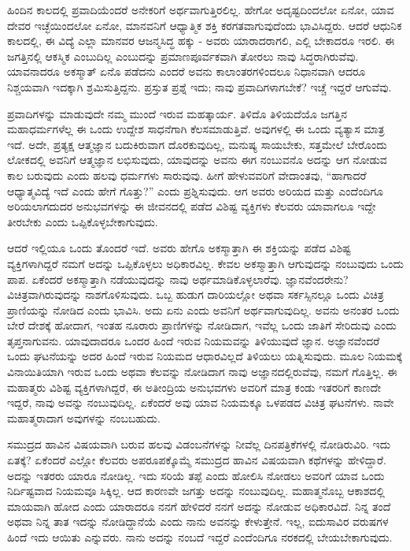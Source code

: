 ಹಿಂದಿನ ಕಾಲದಲ್ಲಿ ಪ್ರವಾದಿಯೆಂದರೆ ಅನೇಕರಿಗೆ ಅರ್ಥವಾಗುತ್ತಿರಲಿಲ್ಲ. ಹೇಗೋ ಅದೃಷ್ಟದಿಂದಲೋ ಏನೋ, ಯಾವ ದೇವರ ಇಚ್ಛೆಯಿಂದಲೋ ಏನೋ, ಮಾನವನಿಗೆ ಆಧ್ಯಾತ್ಮಿಕ ಶಕ್ತಿ ಕರಗತವಾಗುವುದೆಂದು ಭಾವಿಸಿದ್ದರು. ಆದರೆ ಆಧುನಿಕ ಕಾಲದಲ್ಲಿ, ಈ ವಿದ್ಯೆ ಎಲ್ಲಾ ಮಾನವರ ಆಜನ್ಮಸಿದ್ಧ ಹಕ್ಕು - ಅವರು ಯಾರಾದರಾಗಲಿ, ಎಲ್ಲಿ ಬೇಕಾದರೂ ಇರಲಿ. ಈ ಜಗತ್ತಿನಲ್ಲಿ ಆಕಸ್ಮಿಕ ಎಂಬುದಿಲ್ಲ ಎಂಬುದನ್ನು ಪ್ರಮಾಣಪೂರ್ವಕವಾಗಿ ತೋರಲು ನಾವು ಸಿದ್ಧರಾಗಿರುವೆವು. ಯಾವನಾದರೂ ಅಕಸ್ಮಾತ್ ಏನೊ ಪಡೆದನು ಎಂದರೆ ಅವನು ಕಾಲಾಂತರಗಳಿಂದಲೂ ನಿಧಾನವಾಗಿ ಆದರೂ ನಿಶ್ಚಯವಾಗಿ ಇದಕ್ಕಾಗಿ ಶ್ರಮಿಸುತ್ತಿದ್ದನು. ಪ್ರಸ್ತುತ ಪ್ರಶ್ನೆ ಇದು; ನಾವು ಪ್ರವಾದಿಗಳಾಗಬೇಕೆ? ಇಚ್ಚೆ ಇದ್ದರೆ ಆಗುವೆವು.

ಪ್ರವಾದಿಗಳನ್ನು ಮಾಡುವುದೇ ನಮ್ಮ ಮುಂದೆ ಇರುವ ಮಹತ್ಕಾರ್ಯ. ತಿಳಿದೊ ತಿಳಿಯದೆಯೊ ಜಗತ್ತಿನ ಮಹಾಧರ್ಮಗಳೆಲ್ಲ ಈ ಒಂದು ಉದ್ದೇಶ ಸಾಧನೆಗಾಗಿ ಕೆಲಸಮಾಡುತ್ತಿವೆ. ಅವುಗಳಲ್ಲಿ ಈ ಒಂದು ವ್ಯತ್ಯಾಸ ಮಾತ್ರ ಇದೆ. ಅದೇ, ಪ್ರತ್ಯಕ್ಷ ಆತ್ಮಜ್ಞಾನ ಬದುಕಿರುವಾಗ ದೊರಕುವುದಿಲ್ಲ, ಮನುಷ್ಯ ಸಾಯಬೇಕು, ಸತ್ತಮೇಲೆ ಬೇರೊಂದು ಲೋಕದಲ್ಲಿ ಅವನಿಗೆ ಆತ್ಮಜ್ಞಾನ ಲಭಿಸುವುದು, ಯಾವುದನ್ನು ಅವನು ಈಗ ನಂಬುವನೊ ಅದನ್ನು ಆಗ ನೋಡುವ ಕಾಲ ಬರುವುದು ಎಂದು ಹಲವು ಧರ್ಮಗಳು ಸಾರುವುವು. ಹೀಗೆ ಹೇಳುವವರಿಗೆ ವೇದಾಂತವು, “ಹಾಗಾದರೆ ಆಧ್ಯಾತ್ಮವಿದ್ಯೆ ಇದೆ ಎಂದು ಹೇಗೆ ಗೊತ್ತು?'' ಎಂದು ಪ್ರಶ್ನಿಸುವುದು. ಆಗ ಅವರು ಅರಿಯದ ಮತ್ತು ಎಂದೆಂದಿಗೂ ಅರಿಯಲಾಗದುದರ ಅನುಭವಗಳನ್ನು ಈ ಜೀವನದಲ್ಲಿ ಪಡೆದ ವಿಶಿಷ್ಟ ವ್ಯಕ್ತಿಗಳು ಕೆಲವರು ಯಾವಾಗಲೂ ಇದ್ದೇ ತೀರಬೇಕು ಎಂದು ಒಪ್ಪಿಕೊಳ್ಳಬೇಕಾಗುವುದು.

ಆದರೆ ಇಲ್ಲಿಯೂ ಒಂದು ತೊಂದರೆ ಇದೆ. ಅವರು ಹೇಗೊ ಅಕಸ್ಮಾತ್ತಾಗಿ ಈ ಶಕ್ತಿಯನ್ನು ಪಡೆದ ವಿಶಿಷ್ಟ ವ್ಯಕ್ತಿಗಳಾಗಿದ್ದರೆ ನಮಗೆ ಅದನ್ನು ಒಪ್ಪಿಕೊಳ್ಳಲು ಅಧಿಕಾರವಿಲ್ಲ. ಕೇವಲ ಅಕಸ್ಮಾತ್ತಾಗಿ ಆಗುವುದನ್ನು ನಂಬುವುದು ಒಂದು ಪಾಪ. ಏಕೆಂದರೆ ಅಕಸ್ಮಾತ್ತಾಗಿ ನಡೆಯುವುದನ್ನು ನಾವು ಅರ್ಥಮಾಡಿಕೊಳ್ಳಲಾರೆವು. ಜ್ಞಾನವೆಂದರೇನು? ವಿಚಿತ್ರವಾಗಿರುವುದನ್ನು ನಾಶಗೊಳಿಸುವುದು. ಒಬ್ಬ ಹುಡುಗ ದಾರಿಯಲ್ಲೋ ಅಥವಾ ಸರ್ಕಸ್ಸಿನಲ್ಲೂ ಒಂದು ವಿಚಿತ್ರ ಪ್ರಾಣಿಯನ್ನು ನೋಡಿದ ಎಂದು ಭಾವಿಸಿ. ಅದು ಏನು ಎಂದು ಅವನಿಗೆ ಅರ್ಥವಾಗುವುದಿಲ್ಲ. ಅವನು ಅನಂತರ ಒಂದು ಬೇರೆ ದೇಶಕ್ಕೆ ಹೋದಾಗ, ಇಂತಹ ನೂರಾರು ಪ್ರಾಣಿಗಳನ್ನು ನೋಡಿದಾಗ, ಇವೆಲ್ಲ ಒಂದು ಜಾತಿಗೆ ಸೇರಿದುವು ಎಂದು ತೃಪ್ತನಾಗುವನು. ಯಾವುದಾದರೂ ಒಂದರ ಹಿಂದೆ ಇರುವ ನಿಯಮವನ್ನು ತಿಳಿಯುವುದೆ ಜ್ಞಾನ. ಅಜ್ಞಾನವೆಂದರೆ ಒಂದು ಘಟನೆಯನ್ನು ಅದರ ಹಿಂದೆ ಇರುವ ನಿಯಮದ ಆಧಾರವಿಲ್ಲದೆ ತಿಳಿಯಲು ಯತ್ನಿಸುವುದು. ಮೂಲ ನಿಯಮಕ್ಕೆ ವಿನಾಯಿತಿಯಾಗಿ ಇರುವ ಒಂದು ಅಥವಾ ಕೆಲವನ್ನು ನೋಡಿದಾಗ ನಾವು ಅಜ್ಞಾನದಲ್ಲಿರುವೆವು, ನಮಗೆ ಗೊತ್ತಿಲ್ಲ. ಈ ಮಹಾತ್ಮರು ವಿಶಿಷ್ಟ ವ್ಯಕ್ತಿಗಳಾಗಿದ್ದರೆ, ಈ ಅತೀಂದ್ರಿಯ ಅನುಭವಗಳು ಅವರಿಗೆ ಮಾತ್ರ ಕಂಡು ಇತರರಿಗೆ ಕಾಣದೇ ಇದ್ದರೆ, ನಾವು ಅವನ್ನು ನಂಬುವುದಿಲ್ಲ. ಏಕೆಂದರೆ ಅವು ಯಾವ ನಿಯಮಕ್ಕೂ ಒಳಪಡದ ವಿಚಿತ್ರ ಘಟನೆಗಳು. ನಾವೇ ಮಹಾತ್ಮರಾದಾಗ ಅವುಗಳನ್ನು ನಂಬಬಹುದು.

ಸಮುದ್ರದ ಹಾವಿನ ವಿಷಯವಾಗಿ ಬರುವ ಹಲವು ವಿಡಂಬನೆಗಳನ್ನು ನೀವೆಲ್ಲ ದಿನಪತ್ರಿಕೆಗಳಲ್ಲಿ ನೋಡಿರುವಿರಿ. ಇದು ಏತಕ್ಕೆ? ಏಕೆಂದರೆ ಎಲ್ಲೋ ಕೆಲವರು ಅಪರೂಪಕ್ಕೊಮ್ಮೆ ಸಮುದ್ರದ ಹಾವಿನ ವಿಷಯವಾಗಿ ಕಥೆಗಳನ್ನು ಹೇಳಿದ್ದಾರೆ. ಅದನ್ನು ಇತರರು ಯಾರೂ ನೋಡಿಲ್ಲ. ಇದು ಸರಿಯೆ ತಪ್ಪೆ ಎಂದು ಹೋಲಿಸಿ ನೋಡಲು ಅವರಿಗೆ ಯಾವ ಒಂದು ನಿರ್ದಿಷ್ಟವಾದ ನಿಯಮವೂ ಸಿಕ್ಕಿಲ್ಲ. ಆದ ಕಾರಣವೇ ಜಗತ್ತು ಅದನ್ನು ನಂಬುವುದಿಲ್ಲ. ಮಹಾತ್ಮನೊಬ್ಬ ಆಕಾಶದಲ್ಲಿ ಮಾಯವಾಗಿ ಹೋದ ಎಂದು ಯಾರಾದರೂ ನನಗೆ ಹೇಳಿದರೆ ನನಗೆ ಅದನ್ನು ನೋಡುವ ಅಧಿಕಾರವಿದೆ. ನಿನ್ನ ತಂದೆ ಅಥವಾ ನಿನ್ನ ತಾತ ಇದನ್ನು ನೋಡಿದ್ದಾನೆಯೆ ಎಂದು ನಾನು ಅವನನ್ನು ಕೇಳುತ್ತೇನೆ. ಇಲ್ಲ, ಐದುಸಾವಿರ ವರುಷಗಳ ಹಿಂದೆ ಇದು ಆಯಿತು ಎನ್ನುವರು. ನಾನು ಅದನ್ನು ನಂಬದೆ ಇದ್ದರೆ ಎಂದೆಂದಿಗೂ ನರಕದಲ್ಲಿ ಬೇಯಬೇಕಾಗುವುದು.

